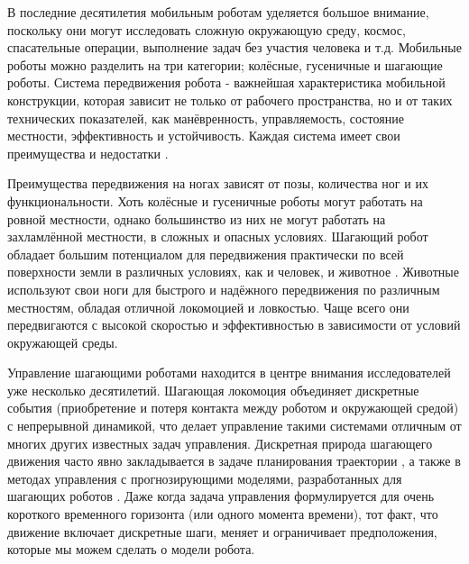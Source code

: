 {\actuality} 

В последние десятилетия мобильным роботам уделяется большое внимание, поскольку они могут исследовать сложную окружающую среду, космос, спасательные операции, выполнение задач без участия человека и т.д. Мобильные роботы можно разделить на три категории; колёсные, гусеничные и шагающие роботы. Система передвижения робота - важнейшая характеристика мобильной конструкции, которая зависит не только от рабочего пространства, но и от таких технических показателей, как манёвренность, управляемость, состояние местности, эффективность и устойчивость. Каждая система имеет свои преимущества и недостатки \cite{zhong2019}.

Преимущества передвижения на ногах зависят от позы, количества ног и их функциональности. Хоть колёсные и гусеничные роботы могут работать на ровной местности, однако большинство из них не могут работать на захламлённой местности, в сложных и опасных условиях. Шагающий робот обладает большим потенциалом для передвижения практически по всей поверхности земли в различных условиях, как и человек, и животное \cite{Silva2012}. Животные используют свои ноги для быстрого и надёжного передвижения по различным местностям, обладая отличной локомоцией и ловкостью. Чаще всего они передвигаются с высокой скоростью и эффективностью в зависимости от условий окружающей среды.

Управление шагающими роботами находится в центре внимания исследователей уже несколько десятилетий. Шагающая локомоция объединяет дискретные события (приобретение и потеря контакта между роботом и окружающей средой) с непрерывной динамикой, что делает управление такими системами отличным от многих других известных задач управления. Дискретная природа шагающего движения часто явно закладывается в задаче планирования траектории \cite{katayama2022whole, lu2023whole}, а также в методах управления с прогнозирующими моделями, разработанных для шагающих роботов \cite{KIM2019, chignoli2021humanoid}. Даже когда задача управления формулируется для очень короткого временного горизонта (или одного момента времени), тот факт, что движение включает дискретные шаги, меняет и ограничивает предположения, которые мы можем сделать о модели робота.

